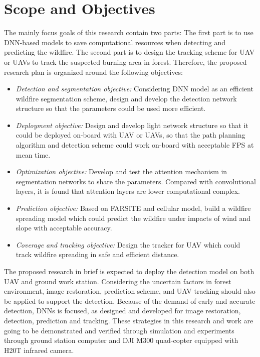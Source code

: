 \section{Scope and Objectives}
The mainly focus goals of this research contain two parts: The first part is to use DNN-based models to save computational resources when detecting and predicting the wildfire. The second part is to design the tracking scheme for UAV or UAVs to track the suspected burning area in forest. Therefore, the proposed research plan is organized around the following objectives:\par
\begin{itemize}
    \item \textit{Detection and segmentation objective:} Considering DNN model as an efficient wildfire segmentation scheme, design and develop the detection network structure so that the parameters could be used more efficient.
    \item \textit{Deployment objective:} Design and develop light network structure so that it could be deployed on-board with UAV or UAVs, so that the path planning algorithm and detection scheme could work on-board with acceptable FPS at mean time.
    \item \textit{Optimization objective:} Develop and test the attention mechanism in segmentation networks to share the parameters. Compared with convolutional layers, it is found that attention layers are lower computational complex.
    \item \textit{Prediction objective:} Based on FARSITE and cellular model, build a wildfire spreading model which could predict the wildfire under impacts of wind and slope with acceptable accuracy.
    \item \textit{Coverage and tracking objective:} Design the tracker for UAV which could track wildfire spreading in safe and efficient distance.   
\end{itemize}\par
The proposed research in brief is expected to deploy the detection model on both UAV and ground work station. Considering the uncertain factors in forest environment, image restoration, prediction scheme, and UAV tracking should also be applied to support the detection. Because of the demand of early and accurate detection, DNNs is focused, as designed and developed for image restoration, detection, prediction and tracking. These strategies in this research and work are going to be demonstrated and verified through simulation and experiments through ground station computer and DJI M300 quad-copter equipped with H20T infrared camera.


